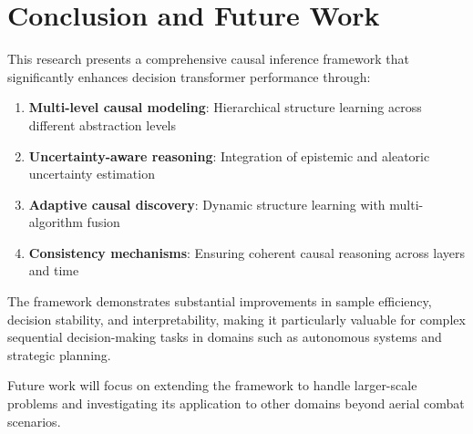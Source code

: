 \documentclass[12pt]{article}
\begin{document}
\section{Conclusion and Future Work}

This research presents a comprehensive causal inference framework that significantly enhances decision transformer performance through:

\begin{enumerate}
\item \textbf{Multi-level causal modeling}: Hierarchical structure learning across different abstraction levels
\item \textbf{Uncertainty-aware reasoning}: Integration of epistemic and aleatoric uncertainty estimation
\item \textbf{Adaptive causal discovery}: Dynamic structure learning with multi-algorithm fusion
\item \textbf{Consistency mechanisms}: Ensuring coherent causal reasoning across layers and time
\end{enumerate}

The framework demonstrates substantial improvements in sample efficiency, decision stability, and interpretability, making it particularly valuable for complex sequential decision-making tasks in domains such as autonomous systems and strategic planning.

Future work will focus on extending the framework to handle larger-scale problems and investigating its application to other domains beyond aerial combat scenarios.
\end{document}
